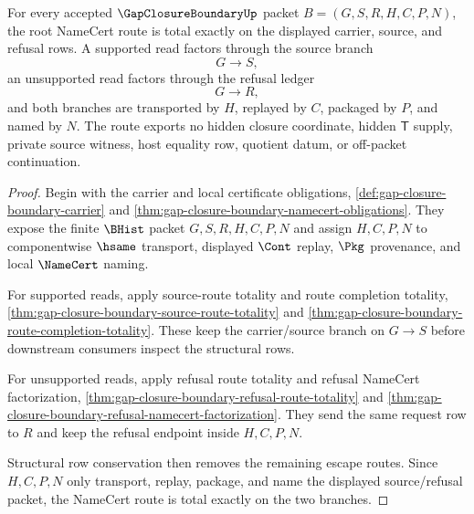 \begin{theorem}
\label{thm:gap-closure-boundary-namecert-route-totality}
For every accepted $\GapClosureBoundaryUp$ packet $B=(G,S,R,H,C,P,N)$, the root NameCert route is total exactly on the displayed carrier, source, and refusal rows. A supported read factors through the source branch
$$
G \longrightarrow S,
$$
an unsupported read factors through the refusal ledger
$$
G \longrightarrow R,
$$
and both branches are transported by $H$, replayed by $C$, packaged by $P$, and named by $N$. The route exports no hidden closure coordinate, hidden $\mathsf{T}$ supply, private source witness, host equality row, quotient datum, or off-packet continuation.
\end{theorem}
\begin{proof}
Begin with the carrier and local certificate obligations, \autoref{def:gap-closure-boundary-carrier} and \autoref{thm:gap-closure-boundary-namecert-obligations}. They expose the finite $\BHist$ packet $G,S,R,H,C,P,N$ and assign $H,C,P,N$ to componentwise $\hsame$ transport, displayed $\Cont$ replay, $\Pkg$ provenance, and local $\NameCert$ naming.

For supported reads, apply source-route totality and route completion totality, \autoref{thm:gap-closure-boundary-source-route-totality} and \autoref{thm:gap-closure-boundary-route-completion-totality}. These keep the carrier/source branch on $G \longrightarrow S$ before downstream consumers inspect the structural rows.

For unsupported reads, apply refusal route totality and refusal NameCert factorization, \autoref{thm:gap-closure-boundary-refusal-route-totality} and \autoref{thm:gap-closure-boundary-refusal-namecert-factorization}. They send the same request row to $R$ and keep the refusal endpoint inside $H,C,P,N$.

Structural row conservation then removes the remaining escape routes. Since $H,C,P,N$ only transport, replay, package, and name the displayed source/refusal packet, the NameCert route is total exactly on the two branches.
\end{proof}


